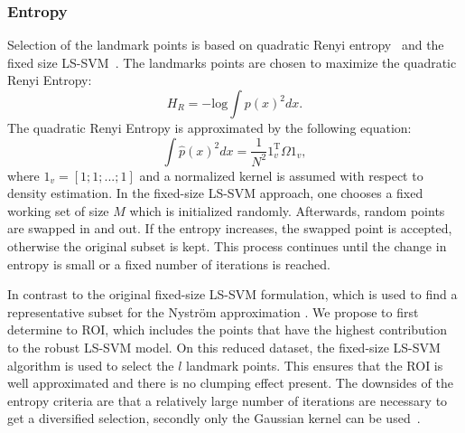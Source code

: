 \documentclass[preprint,12pt]{elsarticle}
\newtheorem*{remark}{Remark}
\begin{document}
	\subsubsection{Entropy}
	Selection of the landmark points is based on quadratic Renyi entropy~\cite{girolami2002orthogonal} and the fixed size LS-SVM~\cite{suykens2002least}. The landmarks points are chosen to maximize the quadratic Renyi Entropy:
	\begin{equation}
	\label{eq:Entropy1}
	H_R = -\mathrm{log}\int p(x)^2 dx.
	\end{equation}
	The quadratic Renyi Entropy is approximated by the following equation\cite{girolami2002orthogonal}:
	\begin{equation}
	\label{eq:Entropy2}
	\int \hat{p}(x)^2dx = \frac{1}{N^2} 1_v^\mathrm{T}\Omega 1_v,
	\end{equation}
	where $1_v = [1;1;...;1]$ and a normalized kernel is assumed with respect to density estimation. In the fixed-size LS-SVM approach, one chooses a fixed working set of size $M$ which is initialized randomly. Afterwards, random points are swapped in and out. If the entropy increases, the swapped point is accepted, otherwise the original subset is kept. This process continues until the change in entropy is small or a fixed number of iterations is reached. 
	
	In contrast to the original fixed-size LS-SVM formulation, which is used to find a representative subset for the Nystr\"{o}m approximation \cite{suykens2002least}. We propose to first determine to ROI, which includes the points that have the highest contribution to the robust LS-SVM model. On this reduced dataset, the fixed-size LS-SVM algorithm is used to select the $l$ landmark points. This ensures that the ROI is well approximated and there is no clumping effect present. The downsides of the entropy criteria are that a relatively large number of iterations are necessary to get a diversified selection, secondly only the Gaussian kernel can be used~\cite{girolami2002orthogonal}.
	
	
	
\end{document}
